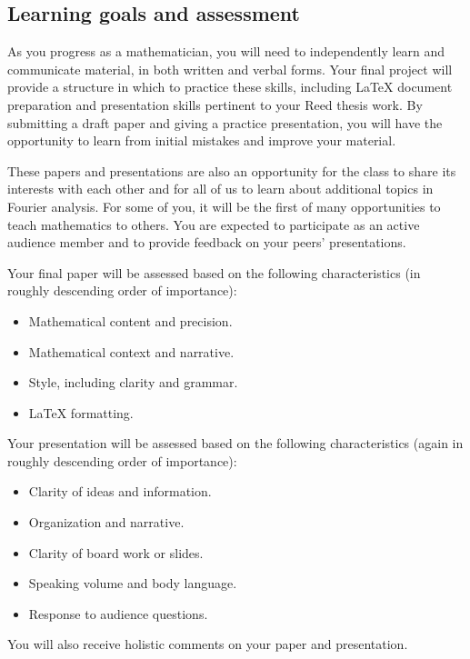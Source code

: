 \documentclass[11pt]{amsart}
\numberwithin{equation}{section} %
\theoremstyle{plain}
\theoremstyle{definition}
\theoremstyle{remark}
\theoremstyle{plain}
\begin{document}
\subsection*{Learning goals and assessment}
As you progress as a mathematician, you will need to independently learn and communicate material, in both written and verbal forms.  Your final project will provide a structure in which to practice these skills, including \LaTeX{} document preparation and presentation skills pertinent to your Reed thesis work.  By submitting a draft paper and giving a practice presentation, you will have the opportunity to learn from initial mistakes and improve your material.

These papers and presentations are also an opportunity for the class to share its interests with each other and for all of us to learn about additional topics in Fourier analysis.  For some of you, it will be the first of many opportunities to teach mathematics to others.  You are expected to participate as an active audience member and to provide feedback on your peers' presentations.

Your final paper will be assessed based on the following characteristics (in roughly descending order of importance):
\begin{itemize}
\item Mathematical content and precision.
\item Mathematical context and narrative.
\item Style, including clarity and grammar.
\item \LaTeX{} formatting.
\end{itemize}
Your presentation will be assessed based on the following characteristics (again in roughly descending order of importance):
\begin{itemize}
\item Clarity of ideas and information.
\item Organization and narrative.
\item Clarity of board work or slides.
\item Speaking volume and body language.
\item Response to audience questions.
\end{itemize}
You will also receive holistic comments on your paper and presentation.
\end{document}
